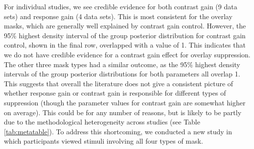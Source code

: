 \documentclass[]{article}
\begin{document}
For individual studies, we see credible evidence for both contrast gain (9 data sets) and response gain (4 data sets). This is most consistent for the overlay masks, which are generally well explained by contrast gain control. However, the 95\% highest density interval of the group posterior distribution for contrast gain control, shown in the final row, overlapped with a value of 1. This indicates that we do not have credible evidence for a contrast gain effect for overlay suppression. The other three mask types had a similar outcome, as the 95\% highest density intervals of the group posterior distributions for both parameters all overlap 1. This suggests that overall the literature does not give a consistent picture of whether response gain or contrast gain is responsible for different types of suppression (though the parameter values for contrast gain are somewhat higher on average). This could be for any number of reasons, but is likely to be partly due to the methodological heterogeneity across studies (see Table \ref{tab:metatable}). To address this shortcoming, we conducted a new study in which participants viewed stimuli involving all four types of mask.
\end{document}
